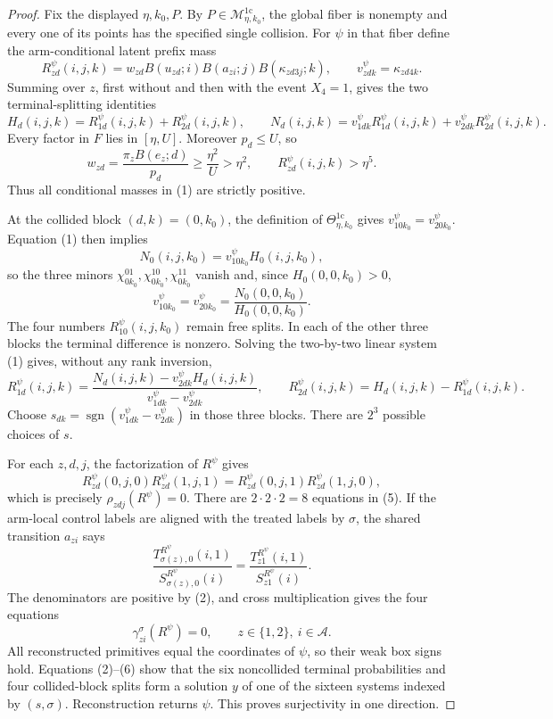 \documentclass{article}
\begin{document}
\begin{proof}
Fix the displayed \(\eta,k_0,P\).  By \(P\in\mathcal M_{\eta,k_0}^{1\mathrm c}\), the global fiber is nonempty and every one of its points has the specified single collision.  For \(\psi\) in that fiber define the arm-conditional latent prefix mass
\[
 R_{zd}^{\psi}(i,j,k)
 =w_{zd}B(u_{zd};i)B(a_{zi};j)B(\kappa_{zd3j};k),
 \qquad v_{zdk}^{\psi}=\kappa_{zd4k}.
\]
Summing over \(z\), first without and then with the event \(X_4=1\), gives the two terminal-splitting identities
\[
 H_d(i,j,k)=R_{1d}^{\psi}(i,j,k)+R_{2d}^{\psi}(i,j,k),
 \qquad
 N_d(i,j,k)=v_{1dk}^{\psi}R_{1d}^{\psi}(i,j,k)+v_{2dk}^{\psi}R_{2d}^{\psi}(i,j,k).
 \tag{1}
\]
Every factor in \(F\) lies in \([\eta,U]\).  Moreover \(p_d\leq U\), so
\[
 w_{zd}=\frac{\pi_zB(e_z;d)}{p_d}\geq\frac{\eta^2}{U}>\eta^2,
 \qquad R_{zd}^{\psi}(i,j,k)>\eta^5.
 \tag{2}
\]
Thus all conditional masses in (1) are strictly positive.

At the collided block \((d,k)=(0,k_0)\), the definition of \(\Theta_{\eta,k_0}^{1\mathrm c}\) gives \(v_{10k_0}^{\psi}=v_{20k_0}^{\psi}\).  Equation (1) then implies
\[
 N_0(i,j,k_0)=v_{10k_0}^{\psi}H_0(i,j,k_0),
 \]
so the three minors \(\chi_{0k_0}^{01},\chi_{0k_0}^{10},\chi_{0k_0}^{11}\) vanish and, since \(H_0(0,0,k_0)>0\),
\[
 v_{10k_0}^{\psi}=v_{20k_0}^{\psi}
 =\frac{N_0(0,0,k_0)}{H_0(0,0,k_0)}.
 \tag{3}
\]
The four numbers \(R_{10}^{\psi}(i,j,k_0)\) remain free splits.  In each of the other three blocks the terminal difference is nonzero.  Solving the two-by-two linear system (1) gives, without any rank inversion,
\[
 R_{1d}^{\psi}(i,j,k)
 =\frac{N_d(i,j,k)-v_{2dk}^{\psi}H_d(i,j,k)}{v_{1dk}^{\psi}-v_{2dk}^{\psi}},
 \qquad R_{2d}^{\psi}(i,j,k)=H_d(i,j,k)-R_{1d}^{\psi}(i,j,k).
 \tag{4}
\]
Choose \(s_{dk}=\operatorname{sgn}(v_{1dk}^{\psi}-v_{2dk}^{\psi})\) in those three blocks.  There are \(2^3\) possible choices of \(s\).

For each \(z,d,j\), the factorization of \(R^{\psi}\) gives
\[
 R_{zd}^{\psi}(0,j,0)R_{zd}^{\psi}(1,j,1)
 =R_{zd}^{\psi}(0,j,1)R_{zd}^{\psi}(1,j,0),
 \tag{5}
\]
which is precisely \(\rho_{zdj}(R^{\psi})=0\).  There are \(2\cdot2\cdot2=8\) equations in (5).  If the arm-local control labels are aligned with the treated labels by \(\sigma\), the shared transition \(a_{zi}\) says
\[
 \frac{T_{\sigma(z),0}^{R^{\psi}}(i,1)}{S_{\sigma(z),0}^{R^{\psi}}(i)}
 =\frac{T_{z1}^{R^{\psi}}(i,1)}{S_{z1}^{R^{\psi}}(i)}.
\]
The denominators are positive by (2), and cross multiplication gives the four equations
\[
 \gamma_{zi}^{\sigma}(R^{\psi})=0,
 \qquad z\in\{1,2\},\ i\in\mathcal A.
 \tag{6}
\]
All reconstructed primitives equal the coordinates of \(\psi\), so their weak box signs hold.  Equations (2)--(6) show that the six noncollided terminal probabilities and four collided-block splits form a solution \(y\) of one of the sixteen systems indexed by \((s,\sigma)\).  Reconstruction returns \(\psi\).  This proves surjectivity in one direction.


\end{proof}
\end{document}
